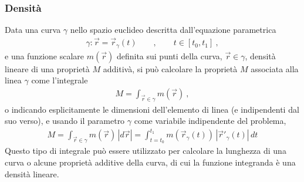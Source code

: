 \documentclass[letterpaper,10pt,italian]{jupyterBook}
\begin{document}
\subsubsection{Densità}
\label{\detokenize{ch/vector-calculus/integrals:densita}}\label{\detokenize{ch/vector-calculus/integrals:vector-calculus-integrals-density}}
\sphinxAtStartPar
Data una curva \(\gamma\) nello spazio euclideo descritta dall’equazione parametrica
\begin{equation*}
\begin{split}\gamma: \vec{r} = \vec{r}_{\gamma}(t) \qquad  , \qquad t \in [t_0, t_1] \ ,\end{split}
\end{equation*}
\sphinxAtStartPar
e una funzione scalare \(m(\vec{r})\) definita sui punti della curva, \(\vec{r} \in \gamma\), densità lineare di una proprietà \(M\) additivà, si può calcolare la proprietà \(M\) associata alla linea \(\gamma\) come l’integrale
\begin{equation*}
\begin{split}M = \int_{\vec{r} \in \gamma} m(\vec{r}) \ ,\end{split}
\end{equation*}
\sphinxAtStartPar
o indicando esplicitamente le dimensioni dell’elemento di linea (e indipendenti dal suo verso), e usando il parametro \(\gamma\) come variabile indipendente del problema,
\begin{equation*}
\begin{split}M = \int_{\vec{r} \in \gamma} m (\vec{r}) \, |d \vec{r}| = \int_{t = t_0}^{t_1} m (\vec{r}_{\gamma}(t)) \, |\vec{r}'_{\gamma}(t)| \, dt\end{split}
\end{equation*}
\sphinxAtStartPar
Questo tipo di integrale può essere utilizzato per calcolare la lunghezza di una curva o alcune proprietà additive della curva, di cui la funzione integranda è una densità lineare.
\label{ch/vector-calculus/integrals:vector-integrals-ex-circle-quarter-length}
\end{document}

